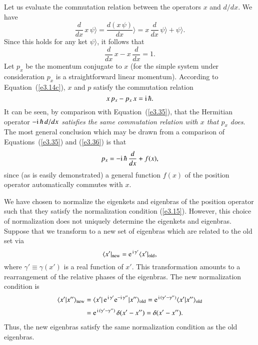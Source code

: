 Let us evaluate the commutation relation between the operators $x$ and $d/dx$.
We have
\begin{equation}
\frac{d}{dx}\, x\, \psi\rangle = \frac{d (x\,\psi)}{dx}\rangle = x\,\frac{d}{dx}\,\psi\rangle
+ \psi\rangle.
\end{equation}
Since this holds for any ket $\psi\rangle$, it follows that
\begin{equation}\label{e3.35}
\frac{d}{dx} \,x - x \,\frac{d}{dx} = 1.
\end{equation}
Let $p_x$ be the momentum conjugate to $x$
 (for the simple system under consideration
 $p_x$ is a straightforward linear momentum). According to Equation~(\ref{e3.14c}),
$x$ and $p$ satisfy the commutation relation
\begin{equation}\label{e3.36}
x\,p_x - p_x\,x = {\rm i} \,\hbar.
\end{equation}
It can be seen, by comparison with Equation~(\ref{e3.35}), that 
the Hermitian operator {\em $ -{\rm i}\,\hbar \,d/dx$
satisfies the same commutation relation with $x$ that $p_x$ does}. 
The most general conclusion which may be drawn from a comparison of Equations~(\ref{e3.35})
and (\ref{e3.36}) is that
\begin{equation}\label{e3.37}
p_x = -{\rm i}\,\hbar\,\frac{d}{dx} + f(x),
\end{equation}
since (as is easily demonstrated) a general function $f(x)$ of the position
operator  automatically commutes with $x$. 

We have chosen to normalize the eigenkets and
eigenbras of the position operator such that they satisfy
the normalization condition (\ref{e3.15}). However, this choice of normalization does not
uniquely determine the eigenkets and
eigenbras. Suppose that we transform to a new
set of eigenbras which are related to the old set via
\begin{equation}\label{e3.38}
\langle x'|_{\rm new} = {\rm e}^{\,{\rm i}\,\gamma'}\langle x'|_{\rm old},
\end{equation}
where $\gamma'\equiv \gamma(x')$ is a real function of $x'$.
This transformation amounts to a rearrangement of the relative
phases of the eigenbras.  The new
normalization condition is
\begin{align}
\langle x'|x''\rangle_{\rm new} &= \langle x'|\, {\rm e}^{\,{\rm i}\,\gamma'}
 {\rm e}^{-{\rm i}\,\gamma''}|x''\rangle_{\rm old} 
= {\rm e}^{\,{\rm i}\,(\gamma'-\gamma'')}
\langle x'|x''\rangle_{\rm old}\nonumber\\[0.5ex]
 &={ \rm e}^{\,{\rm i}\,(\gamma'-\gamma'')}\,\delta(x'-x'')= \delta(x'-x'').
\end{align}
Thus, the new eigenbras satisfy the same normalization condition
 as the old eigenbras. 

